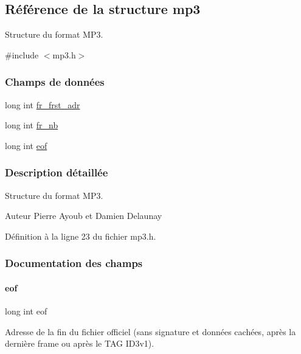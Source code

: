 \hypertarget{a00170}{}\subsection{Référence de la structure mp3}
\label{a00170}


Structure du format M\+P3.  




{\ttfamily \#include $<$mp3.\+h$>$}

\subsubsection*{Champs de données}
\begin{DoxyCompactItemize}
\item 
long int \hyperlink{a00170_a2dd557563c90ce058f662d1298f0e3e6}{fr\+\_\+frst\+\_\+adr}
\item 
long int \hyperlink{a00170_a01ffc583bacb63600e32d207f1cf3475}{fr\+\_\+nb}
\item 
long int \hyperlink{a00170_a7142157770763558acb56818ae46955a}{eof}
\end{DoxyCompactItemize}


\subsubsection{Description détaillée}
Structure du format M\+P3. 

\begin{DoxyAuthor}{Auteur}
Pierre Ayoub et Damien Delaunay 
\end{DoxyAuthor}


Définition à la ligne 23 du fichier mp3.\+h.



\subsubsection{Documentation des champs}
\mbox{\label{a00170_a7142157770763558acb56818ae46955a}} 
\paragraph{\texorpdfstring{eof}{eof}}
{\footnotesize\ttfamily long int eof}

Adresse de la fin du fichier officiel (sans signature et données cachées, après la dernière frame ou après le T\+AG I\+D3v1). 


